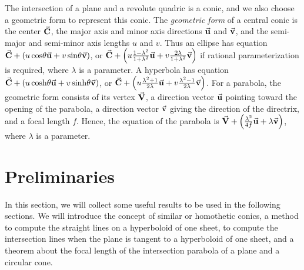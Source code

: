 The intersection of a plane and a revolute quadric is a conic, and
we also choose a geometric form to represent this conic.
The {\em geometric form} of a central conic is
the center $\vec{\bf C}$, the major axis and minor axis
directions $\vec{\bf u}$ and $\vec{\bf v}$, and the semi-major and semi-minor
axis lengths $u$ and $v$.  Thus an ellipse has equation
$\vec{\bf C}+(u\cos\!\theta\vec{\bf u}+ v\sin\!\theta\vec{\bf v})$, or
$\vec{\bf C}+\left(u\frac{1-\lambda^2}{1+\lambda^2}\vec{\bf u}+
v\frac{2\lambda}{1+\lambda^2}\vec{\bf v}\right)$
if rational parameterization is required, where $\lambda$ is a parameter.
A hyperbola has equation
$\vec{\bf C}+(u\cosh\!\theta\vec{\bf u}+v\sinh\!\theta\vec{\bf v})$, or
$\vec{\bf C}+\left(u\frac{\lambda^2+1}{2\lambda}\vec{\bf u}+
v\frac{\lambda^2-1}{2\lambda}\vec{\bf v}\right)$.
For a parabola, the geometric form consists of its vertex
$\vec{\bf V}$, a direction vector $\vec{\bf u}$ pointing toward the opening of the
parabola, a direction vector $\vec{\bf v}$ giving the direction of the directrix,
and a focal length $f$.  Hence, the equation of the parabola is
$\vec{\bf V}+\left(\frac{\lambda^2}{4f}\vec{\bf u}+\lambda\vec{\bf v}\right)$,
where $\lambda$ is a parameter.


\section{Preliminaries}
\label{section:preliminaries}

     In this section, we will collect some useful results to be used in the
following sections.  We will introduce the concept of similar or homothetic
conics, a method to compute the straight lines on a hyperboloid of one sheet,
to compute the intersection lines when the plane is tangent
to a hyperboloid of one sheet,
and a theorem about the focal length of the intersection parabola of a plane
and a circular cone.

